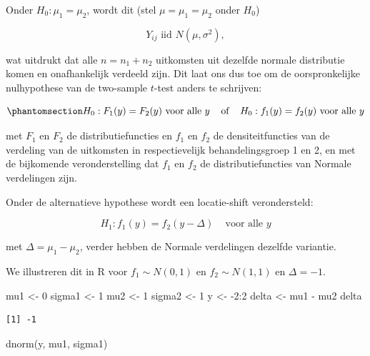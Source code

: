 \documentclass[
  dutch,
  letterpaper,
  12pt]{book}
\newenvironment{Shaded}{\begin{snugshade}}{\end{snugshade}}
\newcommand{\DecValTok}[1]{\textcolor[rgb]{0.68,0.00,0.00}{#1}}
\newcommand{\FunctionTok}[1]{\textcolor[rgb]{0.28,0.35,0.67}{#1}}
\newcommand{\NormalTok}[1]{\textcolor[rgb]{0.00,0.23,0.31}{#1}}
\newcommand{\OtherTok}[1]{\textcolor[rgb]{0.00,0.23,0.31}{#1}}
\newcommand{\SpecialCharTok}[1]{\textcolor[rgb]{0.37,0.37,0.37}{#1}}
\theoremstyle{definition}
\theoremstyle{definition}
\theoremstyle{definition}
\theoremstyle{remark}
\begin{document}
Onder \(H_0:\mu_1=\mu_2\), wordt dit (stel \(\mu=\mu_1=\mu_2\) onder
\(H_0\))

\[ Y_{ij} \text{ iid } N(\mu,\sigma^2),\]

wat uitdrukt dat alle \(n=n_1+n_2\) uitkomsten uit dezelfde normale
distributie komen en onafhankelijk verdeeld zijn. Dit laat ons dus toe
om de oorspronkelijke nulhypothese van de two-sample \(t\)-test anders
te schrijven:

\begin{equation}\protect\phantomsection\label{eq-H0F1F2}{
H_0: F_1(y) = F_2(y) \text{ voor alle } y \;\;\;\text{ of }\;\;\; H_0: f_1(y) = f_2(y) \text{ voor alle } y
}\end{equation}

met \(F_1\) en \(F_2\) de distributiefuncties en \(f_1\) en \(f_2\) de
densiteitfuncties van de verdeling van de uitkomsten in respectievelijk
behandelingsgroep 1 en 2, en met de bijkomende veronderstelling dat
\(f_1\) en \(f_2\) de distributiefuncties van Normale verdelingen zijn.

Onder de alternatieve hypothese wordt een locatie-shift verondersteld:

\[H_1: f_1(y)=f_2(y-\Delta) \;\;\;\text{ voor alle } y\]

met \(\Delta=\mu_1-\mu_2\), verder hebben de Normale verdelingen
dezelfde variantie.

We illustreren dit in R voor \(f_1\sim N(0,1)\) en \(f_2\sim N(1,1)\) en
\(\Delta=-1\).

\begin{Shaded}
\begin{Highlighting}[]
\NormalTok{mu1 }\OtherTok{\textless{}{-}} \DecValTok{0}
\NormalTok{sigma1 }\OtherTok{\textless{}{-}} \DecValTok{1}
\NormalTok{mu2 }\OtherTok{\textless{}{-}} \DecValTok{1}
\NormalTok{sigma2 }\OtherTok{\textless{}{-}} \DecValTok{1}
\NormalTok{y }\OtherTok{\textless{}{-}} \SpecialCharTok{{-}}\DecValTok{2}\SpecialCharTok{:}\DecValTok{2}
\NormalTok{delta }\OtherTok{\textless{}{-}}\NormalTok{ mu1 }\SpecialCharTok{{-}}\NormalTok{ mu2}
\NormalTok{delta}
\end{Highlighting}
\end{Shaded}

\begin{verbatim}
[1] -1
\end{verbatim}

\begin{Shaded}
\begin{Highlighting}[]
\FunctionTok{dnorm}\NormalTok{(y, mu1, sigma1)}
\end{Highlighting}
\end{Shaded}
\end{document}
